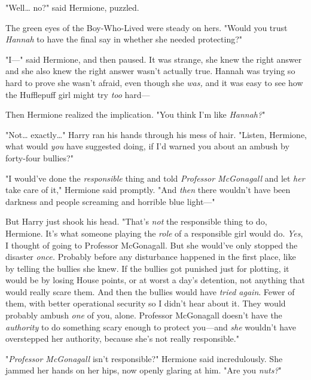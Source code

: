 "Well{\ldots} no?" said Hermione, puzzled.

The green eyes of the Boy-Who-Lived were steady on hers. "Would you trust 
\emph{Hannah} to have the final say in whether she needed protecting?"

"I---" said Hermione, and then paused. It was strange, she knew the right 
answer and she also knew the right answer wasn't actually true. Hannah was 
trying so hard to prove she wasn't afraid, even though she \emph{was,} and it 
was easy to see how the Hufflepuff girl might try \emph{too} hard---

Then Hermione realized the implication. "You think I'm like \emph{Hannah?}"

"Not{\ldots} exactly{\ldots}" Harry ran his hands through his mess of hair. 
"Listen, Hermione, what would \emph{you} have suggested doing, if I'd warned 
you about an ambush by forty-four bullies?"

"I would've done the \emph{responsible} thing and told \emph{Professor 
McGonagall} and let \emph{her} take care of it," Hermione said promptly. "And 
\emph{then} there wouldn't have been darkness and people screaming and horrible 
blue light---"

But Harry just shook his head. "That's \emph{not} the responsible thing to do, 
Hermione. It's what someone playing the \emph{role} of a responsible girl would 
do. \emph{Yes}, I thought of going to Professor McGonagall. But she would've 
only stopped the disaster \emph{once.} Probably before any disturbance happened 
in the first place, like by telling the bullies she knew. If the bullies got 
punished just for plotting, it would be by losing House points, or at worst a 
day's detention, not anything that would really scare them. And then the 
bullies would have \emph{tried again}. Fewer of them, with better operational 
security so I didn't hear about it. They would probably ambush \emph{one} of 
you, alone. Professor McGonagall doesn't have the \emph{authority} to do 
something scary enough to protect you---and \emph{she} wouldn't have 
overstepped her authority, because she's not really responsible."

"\emph{Professor McGonagall} isn't responsible?" Hermione said incredulously. 
She jammed her hands on her hips, now openly glaring at him. "Are you 
\emph{nuts?}"


